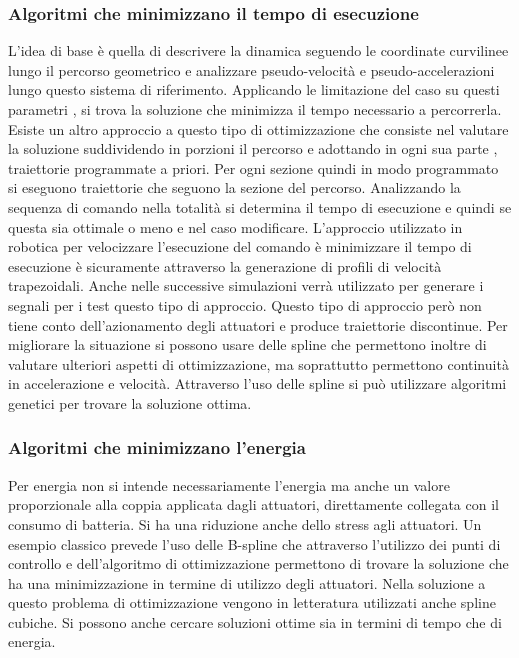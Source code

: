 \subsubsection{Algoritmi che minimizzano il tempo di esecuzione}

L'idea di base è quella di descrivere la dinamica seguendo le coordinate curvilinee lungo il percorso geometrico e analizzare pseudo-velocità e pseudo-accelerazioni lungo questo sistema di riferimento. Applicando le limitazione del caso su questi parametri , si trova la soluzione che minimizza il tempo necessario a percorrerla. Esiste un altro approccio a questo tipo di ottimizzazione che consiste nel valutare la soluzione suddividendo in porzioni il percorso e adottando in ogni sua parte , traiettorie programmate a priori. Per ogni sezione quindi in modo programmato si eseguono traiettorie che seguono la sezione del percorso. Analizzando la sequenza di comando nella totalità si determina il tempo di esecuzione e quindi se questa sia ottimale o meno e nel caso modificare. L'approccio utilizzato in robotica per velocizzare l'esecuzione del comando è minimizzare il tempo di esecuzione è sicuramente attraverso la generazione di profili di velocità trapezoidali. Anche nelle successive simulazioni verrà utilizzato per generare i segnali per i test questo tipo di approccio. Questo tipo di approccio però non tiene conto dell'azionamento degli attuatori e produce traiettorie discontinue. Per migliorare la situazione si possono usare delle spline che permettono inoltre di valutare ulteriori aspetti di ottimizzazione, ma soprattutto permettono continuità in accelerazione e velocità.
Attraverso l'uso delle spline si può utilizzare algoritmi genetici per trovare la soluzione ottima.

\subsubsection{Algoritmi che minimizzano l'energia}
Per energia non si intende necessariamente l'energia ma anche un valore proporzionale alla coppia applicata dagli attuatori, direttamente collegata con il consumo di batteria. Si ha una riduzione anche dello stress agli attuatori. Un esempio classico prevede l'uso delle B-spline che attraverso l'utilizzo dei punti di controllo e dell'algoritmo di ottimizzazione permettono di trovare la soluzione che ha una minimizzazione in termine di utilizzo degli attuatori. Nella soluzione a questo problema di ottimizzazione vengono in letteratura utilizzati anche spline cubiche. Si possono anche cercare soluzioni ottime sia in termini di tempo che di energia.


